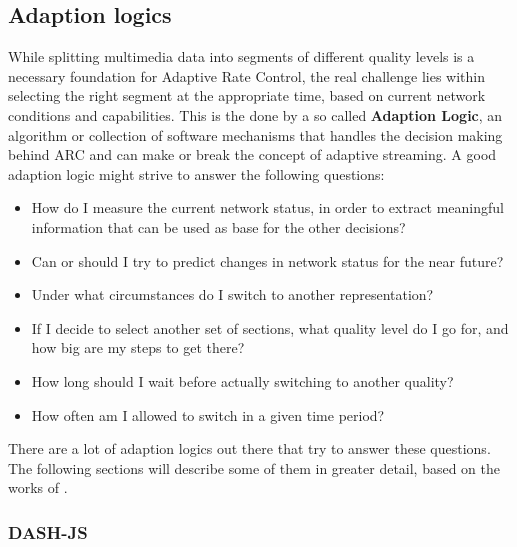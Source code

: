\subsection{Adaption logics}
While splitting multimedia data into segments of different quality levels is a necessary foundation for Adaptive Rate Control, the real challenge lies within selecting the right segment at the appropriate time, based on current network conditions and capabilities. This is the done by a so called \textbf{Adaption Logic}, an algorithm or collection of software mechanisms that handles the decision making behind ARC and can make or break the concept of adaptive streaming. A good adaption logic might strive to answer the following questions: 

\begin{itemize}

\item How do I measure the current network status, in order to extract meaningful information that can be used as base for the other decisions? 

\item Can or should I try to predict changes in network status for the near future? 

\item Under what circumstances do I switch to another representation? 

\item If I decide to select another set of sections, what quality level do I go for, and how big are my steps to get there? 

\item How long should I wait before actually switching to another quality? 

\item How often am I allowed to switch in a given time period?

\end{itemize}

There are a lot of adaption logics out there that try to answer these questions. The following sections will describe some of them in greater detail, based on the works of \cite{TiMR16}.

\subsubsection{DASH-JS} 

